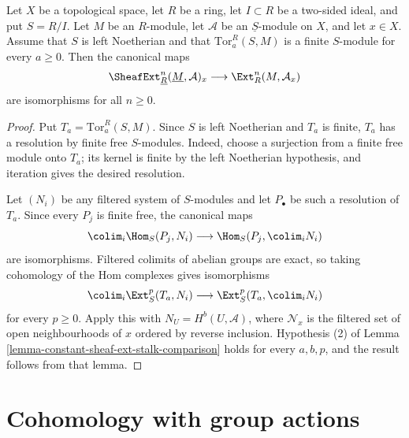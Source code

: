 \begin{lemma}
\label{lemma-constant-sheaf-ext-stalk-noetherian-quotient}
\begin{reference}
\cite[Chapter IV, \S 4.3, Remark 2(b), p. 193]{Tohoku}
\end{reference}
Let $X$ be a topological space, let $R$ be a ring, let $I \subset R$ be a
two-sided ideal, and put $S = R/I$. Let $M$ be an $R$-module, let
$\mathcal{A}$ be an $\underline{S}$-module on $X$, and let $x \in X$.
Assume that $S$ is left Noetherian and that
$\text{Tor}_a^R(S, M)$ is a finite $S$-module for every $a \geq 0$. Then
the canonical maps
$$
\SheafExt^n_{\underline{R}}(\underline{M}, \mathcal{A})_x
\longrightarrow \Ext_R^n(M, \mathcal{A}_x)
$$
are isomorphisms for all $n \geq 0$.
\end{lemma}

\begin{proof}
Put $T_a = \text{Tor}_a^R(S, M)$. Since $S$ is left Noetherian and $T_a$
is finite, $T_a$ has a resolution by finite free $S$-modules. Indeed, choose
a surjection from a finite free module onto $T_a$; its kernel is finite by
the left Noetherian hypothesis, and iteration gives the desired resolution.

Let $(N_i)$ be any filtered system of $S$-modules and let $P_\bullet$ be
such a resolution of $T_a$. Since every $P_j$ is finite free, the canonical
maps
$$
\colim_i \Hom_S(P_j, N_i)
\longrightarrow \Hom_S(P_j, \colim_i N_i)
$$
are isomorphisms. Filtered colimits of abelian groups are exact, so taking
cohomology of the Hom complexes gives isomorphisms
$$
\colim_i \Ext_S^p(T_a, N_i)
\longrightarrow \Ext_S^p(T_a, \colim_i N_i)
$$
for every $p \geq 0$. Apply this with
$N_U = H^b(U, \mathcal{A})$, where $\mathcal{N}_x$ is the filtered set of
open neighbourhoods of $x$ ordered by reverse inclusion. Hypothesis (2) of
Lemma \ref{lemma-constant-sheaf-ext-stalk-comparison} holds for every
$a, b, p$, and the result follows from that lemma.
\end{proof}




\section{Cohomology with group actions}
\label{section-cohomology-group-actions}

